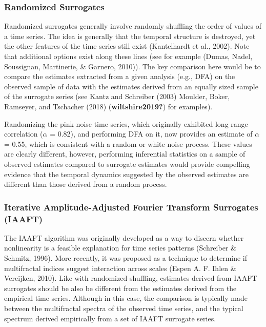 \documentclass[
  man]{apa6}
\begin{document}
\hypertarget{randomized-surrogates}{%
\subsubsection{Randomized Surrogates}\label{randomized-surrogates}}

Randomized surrogates generally involve randomly shuffling the order of
values of a time series. The idea is generally that the temporal
structure is destroyed, yet the other features of the time series still
exist (Kantelhardt et al., 2002). Note that
additional options exist along these lines (see for example
(Dumas, Nadel, Soussignan, Martinerie, \& Garnero, 2010)). The key comparison here
would be to compare the estimates extracted from a given analysis (e.g.,
DFA) on the observed sample of data with the estimates derived from an
equally sized sample of the surrogate series (see Kantz and Schreiber (2003)
Moulder, Boker, Ramseyer, and Tschacher (2018) (\textbf{wiltshire2019?}) for examples).

Randomizing the pink noise time series, which originally exhibited long
range correlation (\(\alpha\) = 0.82), and performing DFA on
it, now provides an estimate of \(\alpha\) = 0.55,
which is consistent with a random or white noise process. These values
are clearly different, however, performing inferential statistics on a
sample of observed estimates compared to surrogate estimates would
provide compelling evidence that the temporal dynamics suggested by the
observed estimates are different than those derived from a random
process.

\hypertarget{iterative-amplitude-adjusted-fourier-transform-surrogates-iaaft}{%
\subsubsection{Iterative Amplitude-Adjusted Fourier Transform Surrogates (IAAFT)}\label{iterative-amplitude-adjusted-fourier-transform-surrogates-iaaft}}

The IAAFT algorithm was originally developed as a way to discern whether
nonlinearity is a feasible explanation for time series patterns
(Schreiber \& Schmitz, 1996). More recently, it was proposed as a technique to
determine if multifractal indices suggest interaction across scales
(Espen A. F. Ihlen \& Vereijken, 2010). Like with randomized shuffling, estimates derived from
IAAFT surrogates should be also be different from the estimates derived
from the empirical time series. Although in this case, the comparison is
typically made between the multifractal spectra of the observed time
series, and the typical spectrum derived empirically from a set of IAAFT
surrogate series.
\end{document}
